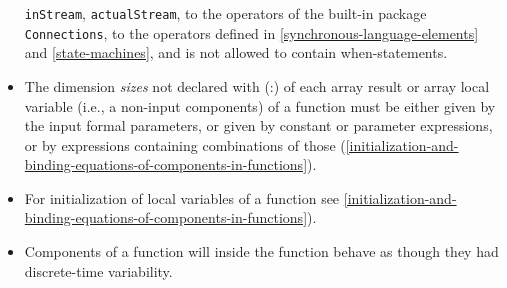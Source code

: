 \begin{itemize}
	\lstinline!inStream!, \lstinline!actualStream!,
  to the operators of the built-in package \lstinline!Connections!, to the operators
  defined in \autoref{synchronous-language-elements} and \autoref{state-machines}, and is not allowed to contain
  when-statements.
\item
  The dimension \emph{sizes} not declared with (:) of each array result
  or array local variable (i.e., a non-input components) of a
  function must be either given by the input formal parameters, or given
  by constant or parameter expressions, or by expressions containing
  combinations of those (\autoref{initialization-and-binding-equations-of-components-in-functions}).
\item
  For initialization of local variables of a function see \autoref{initialization-and-binding-equations-of-components-in-functions}).
\item
  Components of a function will inside the function behave as though
  they had discrete-time variability.
\end{itemize}

